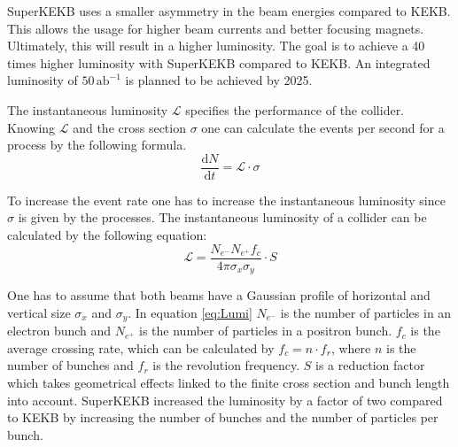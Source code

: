 \documentclass[a4paper,11pt,twosided,final,german,openbib,pdftex,listof=totoc,bibliography=totoc]{scrbook}
\begin{document}
SuperKEKB uses a smaller asymmetry in the beam energies compared to KEKB. This allows the usage for higher beam currents and better focusing magnets. Ultimately, this will result in a higher luminosity. The goal is to achieve a 40 times higher luminosity with SuperKEKB compared to KEKB.
An integrated luminosity of $50\,\textrm{ab}^{-1}$ is planned to be achieved by 2025.\cite{B2B}

The instantaneous luminosity $\mathcal{L}$ specifies the performance of the collider. Knowing $\mathcal{L} $ and the cross section $\sigma$ one can calculate the events per second for a process by the following formula.
\begin{equation}
\frac{\textrm{d}N}{\textrm{d}t} = \mathcal{L} \cdot \sigma
\end{equation} 

To increase the event rate one has to increase the instantaneous luminosity since $\sigma$ is given by the processes. The instantaneous luminosity of a collider can be calculated by the following equation:
\begin{equation}
	\mathcal{L} = \frac{N_{e^-}N_{e^+}f_c}{4\pi \sigma_x \sigma_y} \cdot S
	\label{eq:Lumi}
\end{equation}

One has to assume that both beams have a Gaussian profile of horizontal and vertical size $\sigma_x$ and $\sigma_y$. In equation \ref{eq:Lumi} $N_{e^-}$ is the number of particles in an electron bunch and $N_{e^+}$ is the number of particles in a positron bunch. $f_c$ is the average crossing rate, which can be calculated by $f_c = n \cdot f_r$, where $n$ is the number of bunches and $f_r$ is the revolution frequency. $S$ is a reduction factor which takes geometrical effects linked to the finite cross section and bunch length into account.\cite{herr2006concept} 
SuperKEKB increased the luminosity by a factor of two compared to KEKB by increasing the number of bunches and the number of particles per bunch.
 
\end{document}
